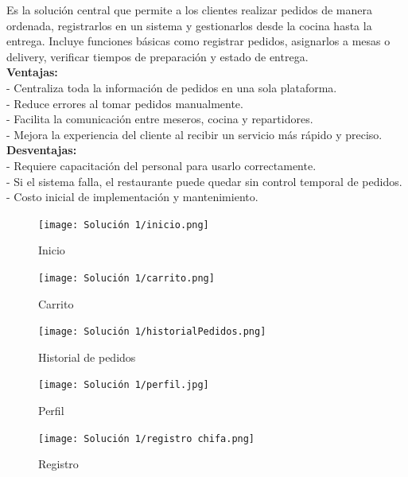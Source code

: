 \documentclass{article}
\begin{document}
\begin{doublespace}
    \noindent Es la solución central que permite a los clientes realizar pedidos de manera ordenada, registrarlos en un sistema y gestionarlos desde la cocina hasta la entrega. Incluye funciones básicas como registrar pedidos, asignarlos a mesas o delivery, verificar tiempos de preparación y estado de entrega.\\
    \textbf{Ventajas:}\\
    - Centraliza toda la información de pedidos en una sola plataforma.\\
    - Reduce errores al tomar pedidos manualmente.\\
    - Facilita la comunicación entre meseros, cocina y repartidores.\\
    - Mejora la experiencia del cliente al recibir un servicio más rápido y preciso.\\
    \textbf{Desventajas:}\\
    - Requiere capacitación del personal para usarlo correctamente.\\
    - Si el sistema falla, el restaurante puede quedar sin control temporal de pedidos.\\
    - Costo inicial de implementación y mantenimiento.\\

    \begin{figure}[H]
        \centering
        \vspace*{1cm}
        \texttt{[image: Solución 1/inicio.png]}
        \caption{Inicio}
        \label{fig:Inicio}
    \end{figure}
    \begin{figure}[H]
        \centering
        \vspace*{1cm}
        \texttt{[image: Solución 1/carrito.png]}
        \caption{Carrito}
        \label{fig:Carrito}
    \end{figure}
    \begin{figure}[H]
        \centering
        \vspace*{1cm}
        \texttt{[image: Solución 1/historialPedidos.png]}
        \caption{Historial de pedidos}
        \label{fig:Historial-Pedidos}
    \end{figure}
    \begin{figure}[H]
        \centering
        \vspace*{1cm}
        \texttt{[image: Solución 1/perfil.jpg]}
        \caption{Perfil}
        \label{fig:Perfil}
    \end{figure}
    \begin{figure}[H]
        \centering
        \vspace*{1cm}
        \texttt{[image: Solución 1/registro chifa.png]}
        \caption{Registro}
        \label{fig:Registro}
    \end{figure}
    

\end{doublespace}
\end{document}
